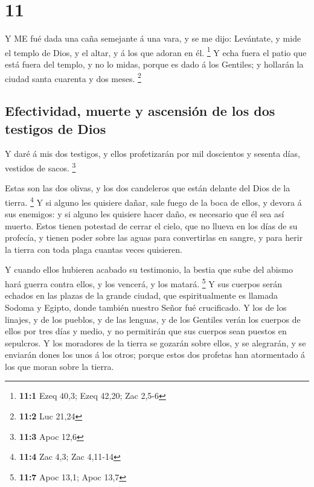 \hypertarget{section-10}{%
\section{11}\label{section-10}}

 Y ME fué dada una caña semejante á una vara, y se me dijo:
Levántate, y mide el templo de Dios, y el altar, y á los que adoran en
él. \footnote{\textbf{11:1} Ezeq 40,3; Ezeq 42,20; Zac 2,5-6}
 Y echa fuera el patio que está fuera del templo, y no lo
midas, porque es dado á los Gentiles; y hollarán la ciudad santa
cuarenta y dos meses. \footnote{\textbf{11:2} Luc 21,24}

\hypertarget{efectividad-muerte-y-ascensiuxf3n-de-los-dos-testigos-de-dios}{%
\subsection{Efectividad, muerte y ascensión de los dos testigos de
Dios}\label{efectividad-muerte-y-ascensiuxf3n-de-los-dos-testigos-de-dios}}

 Y daré á mis dos testigos, y ellos profetizarán por mil
doscientos y sesenta días, vestidos de sacos. \footnote{\textbf{11:3}
  Apoc 12,6}

 Estas son las dos olivas, y los dos candeleros que están
delante del Dios de la tierra. \footnote{\textbf{11:4} Zac 4,3; Zac
  4,11-14}  Y si alguno les quisiere dañar, sale fuego de la
boca de ellos, y devora á sus enemigos: y si alguno les quisiere hacer
daño, es necesario que él sea así muerto.  Estos tienen
potestad de cerrar el cielo, que no llueva en los días de su profecía, y
tienen poder sobre las aguas para convertirlas en sangre, y para herir
la tierra con toda plaga cuantas veces quisieren.

 Y cuando ellos hubieren acabado su testimonio, la bestia
que sube del abismo hará guerra contra ellos, y los vencerá, y los
matará. \footnote{\textbf{11:7} Apoc 13,1; Apoc 13,7}  Y sus
cuerpos serán echados en las plazas de la grande ciudad, que
espiritualmente es llamada Sodoma y Egipto, donde también nuestro Señor
fué crucificado.  Y los de los linajes, y de los pueblos, y
de las lenguas, y de los Gentiles verán los cuerpos de ellos por tres
días y medio, y no permitirán que sus cuerpos sean puestos en sepulcros.
 Y los moradores de la tierra se gozarán sobre ellos, y se
alegrarán, y se enviarán dones los unos á los otros; porque estos dos
profetas han atormentado á los que moran sobre la tierra.

